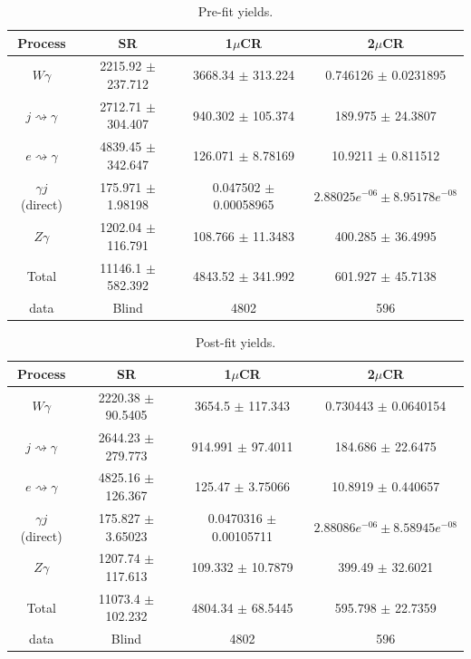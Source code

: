 \begin{table}[htpb!]

\centering
\begin{tabular}{c|ccc}
\hline
\textbf{Process} & \textbf{SR} & \textbf{1$\mu$CR} & \textbf{2$\mu$CR} \\
\hline
$W\gamma$ & 2215.92 $\pm$ 237.712 & 3668.34 $\pm$ 313.224 & 0.746126 $\pm$ 0.0231895 \\ 
$j\rightsquigarrow\gamma$ & 2712.71 $\pm$ 304.407 & 940.302 $\pm$ 105.374 & 189.975 $\pm$ 24.3807 \\ 
$e\rightsquigarrow\gamma$ & 4839.45 $\pm$ 342.647 & 126.071 $\pm$ 8.78169 & 10.9211 $\pm$ 0.811512 \\   
$\gamma j$ (direct) & 175.971 $\pm$ 1.98198 & 0.047502 $\pm$   0.00058965 & ${2.88025e^{-06} \pm 8.95178e^{-08}}$ \\ 
$Z\gamma$ & 1202.04 $\pm$ 116.791 & 108.766 $\pm$ 11.3483 & 400.285 $\pm$ 36.4995\\ \hline
Total &  11146.1 $\pm$ 582.392 & 4843.52 $\pm$ 341.992 & 601.927 $\pm$ 45.7138 \\ \hline
data & Blind & 4802 & 596 \\ \hline

\end{tabular}
\caption{Pre-fit yields.}
\label{tab:yields_pre_syst_nocr}
\end{table}

\begin{table}[htpb!]
\centering
\begin{tabular}{c|ccc}
\hline
\textbf{Process}  & \textbf{SR} & \textbf{1$\mu$CR} & \textbf{2$\mu$CR} \\
\hline
$W\gamma$ & 2220.38 $\pm$ 90.5405 &  3654.5 $\pm$ 117.343 & 0.730443 $\pm$ 0.0640154 \\ 
$j\rightsquigarrow\gamma$ & 2644.23 $\pm$ 279.773 &  914.991 $\pm$ 97.4011 & 184.686 $\pm$ 22.6475 \\ 
$e\rightsquigarrow\gamma$ & 4825.16 $\pm$ 126.367 &  125.47 $\pm$ 3.75066 & 10.8919 $\pm$ 0.440657 \\ 
$\gamma j$ (direct) & 175.827 $\pm$ 3.65023 &  0.0470316 $\pm$ 0.00105711 & $2.88086e^{-06} \pm 8.58945e^{-08}$ \\ 
$Z\gamma$ & 1207.74 $\pm$ 117.613 &  109.332 $\pm$ 10.7879 & 399.49 $\pm$ 32.6021 \\ \hline
Total & 11073.4 $\pm$ 102.232 &  4804.34 $\pm$ 68.5445 & 595.798 $\pm$ 22.7359 \\ \hline
data & Blind & 4802 & 596 \\ \hline

\end{tabular}
\caption{Post-fit yields.}
\label{tab:yields_post_syst_nocr}
\end{table}


